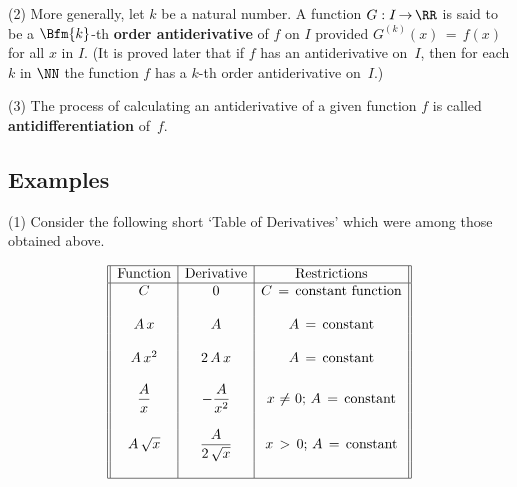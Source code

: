 {\V

        (2) More generally, let $k$ be a natural number. A function $G:I \,{\rightarrow}\, {\RR}$ is said to be a
    $\Bfm{k}$-th {\bf order antiderivative} of $f$ on $I$
    provided $G^{(k)}(x) \,=\, f(x)$ for all $x$ in $I$. (It is proved later that if $f$ has an antiderivative on~$I$,
    then for each $k$ in ${\NN}$ the function $f$ has a $k$-th order antiderivative on~$I$.)

\V

        (3) The process of calculating an antiderivative of a given function $f$ is called
    {\bf antidifferentiation} of~$f$.


\VV

             \subsection{\small{\bf Examples}}
            \label{ExampE45.40}

\V

        (1) Consider the following short `Table of Derivatives' which were among those obtained above.

\V

        \begin{displaymath}
        \begin{array}{||c|c|c||}
\hline
        \mbox{Function} & \mbox{Derivative} & \mbox{Restrictions} \\
\hline

            C  &     0       & C \,=\, \mbox{constant function} \\
               &             &             \\
        A\,x  &  A & A \,=\, \mbox{constant}\\
               &             &             \\
        A\,x^{2}  &  2\,A\,x & A \,=\, \mbox{constant}\\
               &             &             \\
        {\displaystyle \frac{A}{x}} & {\displaystyle -\frac{A}{x^{2}}} & x \,\,{\neq}\,\, 0;\, A \,=\, \mbox{constant} \\
               &             &             \\
        A\,\sqrt{x} & {\displaystyle \frac{A}{2\,\sqrt{x}}} & x\,>\,0;\,A \,=\, \mbox{constant}  \\
                       &             &             \\
\hline
        \end{array}
        \end{displaymath}

}
